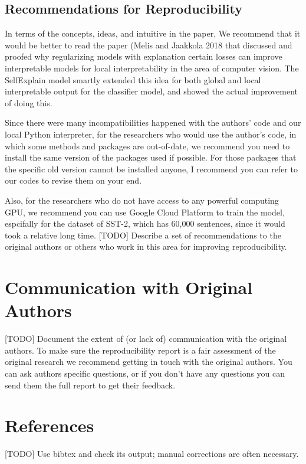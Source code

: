 \documentclass{article}
\begin{document}
\subsection{Recommendations for Reproducibility}

In terms of the concepts, ideas, and intuitive in the paper, We recommend that it would be better to read the paper (Melis and Jaakkola 2018 that discussed and proofed why regularizing models with explanation certain losses can improve interpretable models for local interpretability in the area of computer vision. The SelfExplain model smartly extended this idea for both global and local interpretable output for the classifier model, and showed the actual improvement of doing this. 

Since there were many incompatibilities happened with the authors' code and our local Python interpreter, for the researchers who would use the author's code, in which some methods and packages are out-of-date, we recommend you need to install the same version of the packages used if possible. For those packages that the specific old version cannot be installed anyone, I recommend you can refer to our codes to revise them on your end. 

Also, for the researchers who do not have access to any powerful computing GPU, we recommend you can use Google Cloud Platform to train the model, espcifally for the dataset of SST-2, which has 60,000 sentences, since it would took a relative long time. 
[TODO] Describe a set of recommendations to the original authors or others who work in this area for improving reproducibility.

\section*{Communication with Original Authors}

[TODO] Document the extent of (or lack of) communication with the original authors. To make sure the reproducibility report is a fair assessment of the original research we recommend getting in touch with the original authors. You can ask authors specific questions, or if you don't have any questions you can send them the full report to get their feedback.


\section*{References}

[TODO] Use bibtex and check its output; manual corrections are often necessary.
\end{document}
